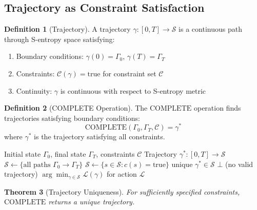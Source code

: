 \documentclass[10pt,twocolumn]{article}
\theoremstyle{plain}
\newtheorem{theorem}{Theorem}[section]
\theoremstyle{definition}
\newtheorem{definition}[theorem]{Definition}
\theoremstyle{remark}
\newcommand{\Sspace}{\mathcal{S}}
\newcommand{\Gstate}{\Gamma}
\begin{document}
\subsection{Trajectory as Constraint Satisfaction}

\begin{definition}[Trajectory]
\label{def:trajectory}
A trajectory $\gamma: [0,T] \to \Sspace$ is a continuous path through S-entropy space satisfying:
\begin{enumerate}[label=(\roman*)]
\item Boundary conditions: $\gamma(0) = \Gstate_0$, $\gamma(T) = \Gstate_T$
\item Constraints: $\mathcal{C}(\gamma) = \mathrm{true}$ for constraint set $\mathcal{C}$
\item Continuity: $\gamma$ is continuous with respect to S-entropy metric
\end{enumerate}
\end{definition}

\begin{definition}[COMPLETE Operation]
\label{def:complete}
The $\mathrm{COMPLETE}$ operation finds trajectories satisfying boundary conditions:
\begin{equation}
\mathrm{COMPLETE}(\Gstate_0, \Gstate_T, \mathcal{C}) = \gamma^*
\label{eq:complete}
\end{equation}
where $\gamma^*$ is the trajectory satisfying all constraints.
\end{definition}

\begin{algorithm}[h]
\caption{COMPLETE: Constraint Satisfaction Trajectory Resolution}
\label{alg:complete}
\begin{algorithmic}[1]
\REQUIRE Initial state $\Gstate_0$, final state $\Gstate_T$, constraints $\mathcal{C}$
\ENSURE Trajectory $\gamma^*: [0,T] \to \Sspace$
\STATE $\mathcal{S} \leftarrow \{\text{all paths } \Gstate_0 \to \Gstate_T\}$
    \STATE $\mathcal{S} \leftarrow \{s \in \mathcal{S} : c(s) = \mathrm{true}\}$
\ENDFOR
{}
    \RETURN unique $\gamma^* \in \mathcal{S}$
    \RETURN $\bot$ (no valid trajectory)
\ELSE
    \RETURN $\arg\min_{\gamma \in \mathcal{S}} \mathcal{L}(\gamma)$ for action $\mathcal{L}$
\ENDIF
\end{algorithmic}
\end{algorithm}

\begin{theorem}[Trajectory Uniqueness]
\label{thm:uniqueness}
For sufficiently specified constraints, $\mathrm{COMPLETE}$ returns a unique trajectory.
\end{theorem}
\end{document}
